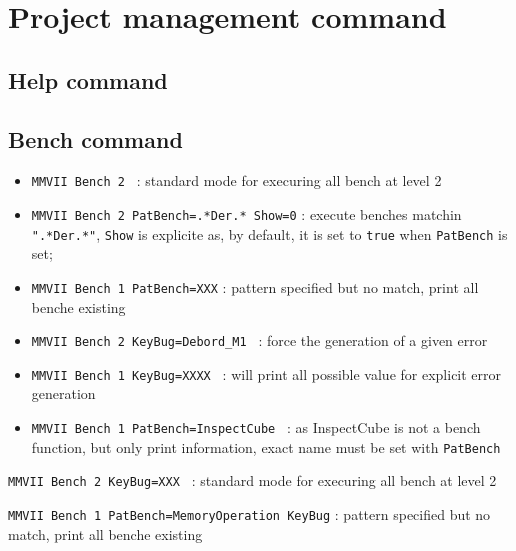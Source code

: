 

\chapter{Project management command}

\section{Help command}

\label{HelpCmd}


\section{Bench command}


\begin{itemize}
    \item {\tt  MMVII Bench 2 }  : standard mode  for execuring all bench at level 2

    \item {\tt MMVII Bench 2 PatBench=.*Der.* Show=0}  : execute benches matchin {\tt ".*Der.*"},
          {\tt  Show} is explicite as, by default, it is set to {\tt  true} 
          when {\tt  PatBench} is set;
   
    \item {\tt MMVII Bench 1 PatBench=XXX} : pattern specified but no match, print all benche existing


    \item {\tt MMVII Bench 2 KeyBug=Debord\_M1 }  : force the generation of  a given error

    \item {\tt MMVII Bench 1 KeyBug=XXXX }  : will print all possible value for explicit error generation


    \item {\tt MMVII Bench 1 PatBench=InspectCube }  : as InspectCube is not a bench function, but 
         only print information, exact name must be set with {\tt PatBench}

\end{itemize}






{\tt MMVII Bench 2 KeyBug=XXX }  : standard mode  for execuring all bench at level 2

{\tt MMVII Bench 1 PatBench=MemoryOperation KeyBug} : pattern specified but no match, print all benche existing

